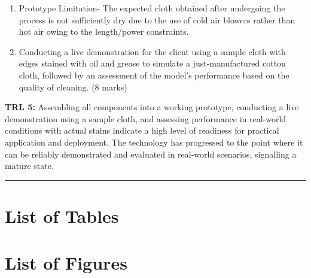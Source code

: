 \documentclass[table,french,english]{rapportCS}
\begin{document}
\begin{enumerate}[label=\arabic*.]
\item Prototype Limitation-
The expected cloth obtained after undergoing the process is not sufficiently dry due to the use of cold air blowers rather than hot air owing to the length/power constraints.
\item Conducting a live demonstration for the client using a sample cloth with edges stained with oil and grease to simulate a just-manufactured cotton cloth, followed by an assessment of the model's performance based on the quality of cleaning. (8 marks)

\end{enumerate}

\textbf{TRL 5:} Assembling all components into a working  \gls{prototype}, conducting a live demonstration using a sample cloth, and assessing performance in real-world conditions with actual stains indicate a high level of readiness for practical application and deployment. The technology has progressed to the point where it can be reliably demonstrated and evaluated in real-world scenarios, signalling a mature state.
\newline
\rule{\linewidth}{0.5pt}
\newpage

\newpage
\pagestyle{plain}
\section*{List of Tables}\label{sec:listoftables} 
\renewcommand{\listtablename}{}
\listoftables

\newpage
\pagestyle{plain}
\section*{List of Figures}\label{sec:listoffigures}
\renewcommand{\listfigurename}{}
\end{document}
